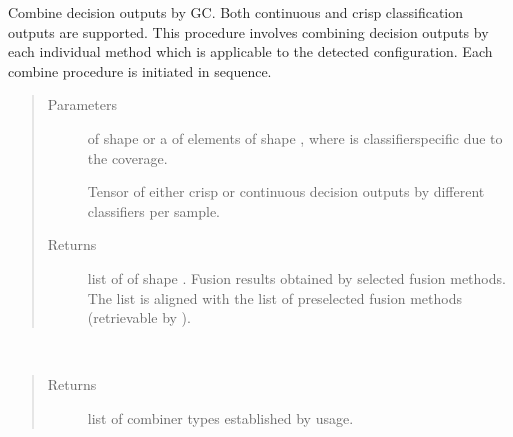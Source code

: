\documentclass[letterpaper,10pt,english]{sphinxmanual}
\begin{document}
\begin{fulllineitems}
\begin{fulllineitems}
\label{\detokenize{pusion.auto.auto_combiner:pusion.auto.auto_combiner.AutoCombiner.combine_seq}}
\sphinxAtStartPar
Combine decision outputs by GC. Both continuous and crisp classification outputs are supported.
This procedure involves combining decision outputs by each individual method which is applicable
to the detected configuration. Each combine procedure is initiated in sequence.
\begin{quote}\begin{description}
\item[{Parameters}] \leavevmode
\sphinxAtStartPar
{} \textendash{} 
\sphinxAtStartPar
{} of shape  or a  of
 elements of shape , where  is classifier\sphinxhyphen{}specific
due to the coverage.

\sphinxAtStartPar
Tensor of either crisp or continuous decision outputs by different classifiers per sample.


\item[{Returns}] \leavevmode
\sphinxAtStartPar
list of  of shape .
Fusion results obtained by selected fusion methods.
The list is aligned with the list of preselected fusion methods (retrievable by ).

\end{description}\end{quote}

\end{fulllineitems}


\begin{fulllineitems}
\label{\detokenize{pusion.auto.auto_combiner:pusion.auto.auto_combiner.AutoCombiner.get_combiner_type_selection}}~\begin{quote}\begin{description}
\item[{Returns}] \leavevmode
\sphinxAtStartPar
list of combiner types established by usage.


\end{description}
\end{quote}
\end{fulllineitems}
\end{fulllineitems}
\end{document}
